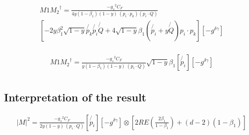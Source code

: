\begin{equation}
\begin{split}
&M1{M_2}^{\dagger}=\frac{-{g_s}^2 C_F}{4 y(1-\beta_1) (1-y)\:(p_i \cdot p_k)(p_i \cdot Q)}\\
&[-2y\beta_1^2\sqrt{1-y} \not{p_k}\not{p_i}\not{Q}+4\sqrt{1-y}\beta_1(\not{p_i}+y\not{Q})p_i\cdot p_k][-g^{\delta{{\gamma}}}]\\
\end{split}
\end{equation}

\begin{equation}
\begin{split}
&M1{M_2}^{\dagger}=\frac{-{g_s}^2 C_F}{y(1-\beta_1) (1-y)\:(p_i \cdot Q)}\sqrt{1-y}\beta_1[\not{p_i}][-g^{\delta{{\gamma}}}]\\
\end{split}
\end{equation}

\subsection{Interpretation of the result}

\begin{equation}
\begin{split}
&|M|^{2}=\frac{-{g_s}^2 C_F}{2y (1-y)\:(p_i \cdot Q)}[\not{p_i}][-g^{\delta{{\gamma}}}]\otimes [2RE(\frac{2\beta_1}{1-\beta_1})+(d-2)(1-\beta_1)]\\
\end{split}
\end{equation}


















